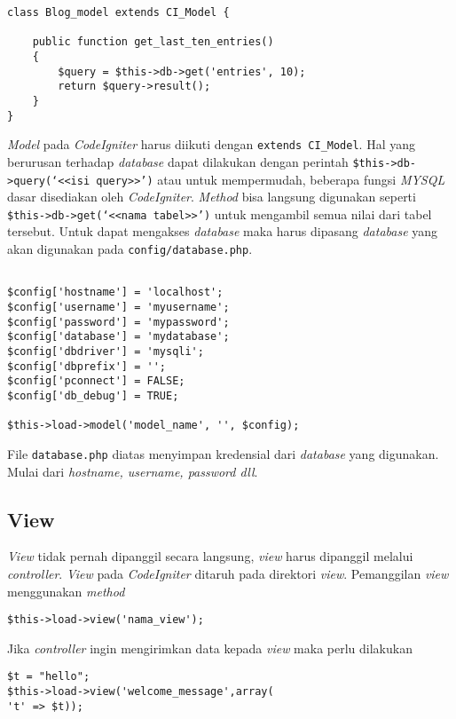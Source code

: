 \begin{lstlisting}
class Blog_model extends CI_Model {
	
	public function get_last_ten_entries()
	{
		$query = $this->db->get('entries', 10);
		return $query->result();
	}
}
\end{lstlisting}

\textit{Model} pada \textit{CodeIgniter} harus diikuti dengan \texttt{extends CI\_Model}. Hal yang berurusan terhadap \textit{database} dapat dilakukan dengan perintah \texttt{\$this->db->query(\lq<<isi query>>\rq)} atau untuk mempermudah, beberapa fungsi \textit{MYSQL} dasar disediakan oleh \textit{CodeIgniter}.\textit{ Method} bisa langsung digunakan seperti \texttt{\$this->db->get(\lq<<nama tabel>>\rq)}
untuk mengambil semua nilai dari tabel tersebut. Untuk dapat mengakses \textit{database} maka harus dipasang \textit{database} yang akan digunakan pada \texttt{config/database.php}.

\begin{lstlisting}
		
$config['hostname'] = 'localhost';
$config['username'] = 'myusername';
$config['password'] = 'mypassword';
$config['database'] = 'mydatabase';
$config['dbdriver'] = 'mysqli';
$config['dbprefix'] = '';
$config['pconnect'] = FALSE;
$config['db_debug'] = TRUE;

$this->load->model('model_name', '', $config);
\end{lstlisting}

File \texttt{database.php} diatas menyimpan kredensial dari \textit{database} yang digunakan. Mulai dari \textit{hostname, username, password dll}.

\subsection{View}


\textit{View} tidak pernah dipanggil secara langsung, \textit{view} harus dipanggil melalui \textit{controller}\cite{codeigniter3}.
\textit{View} pada \textit{CodeIgniter} ditaruh pada direktori \textit{view}. Pemanggilan \textit{view} menggunakan \textit{method} 
\begin{lstlisting}
$this->load->view('nama_view');
\end{lstlisting}

Jika \textit{controller} ingin mengirimkan data kepada \textit{view} maka perlu dilakukan 

\begin{lstlisting}
$t = "hello";
$this->load->view('welcome_message',array(
't' => $t));
\end{lstlisting}

